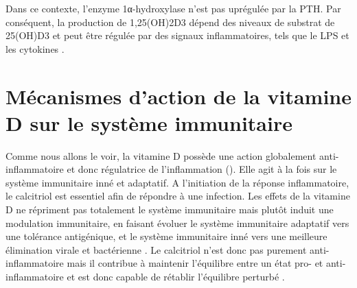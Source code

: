\documentclass[
  a4paper,
  DIV=11,
  numbers=noendperiod,
  listof=totoc]{scrreprt}
\begin{document}
Dans ce contexte, l'enzyme 1α-hydroxylase n'est pas uprégulée par la
\ac{PTH}. Par conséquent, la production de \ac{1,25(OH)2D3} dépend des
niveaux de substrat de \ac{25(OH)D3} et peut être régulée par des
signaux inflammatoires, tels que le \ac{LPS} et les cytokines
\autocite{Giannini.2022}.

\section{Mécanismes d'action de la vitamine D sur le système
immunitaire}\label{muxe9canismes-daction-de-la-vitamine-d-sur-le-systuxe8me-immunitaire}

Comme nous allons le voir, la vitamine D possède une action globalement
anti-inflammatoire et donc régulatrice de l'inflammation
(). Elle agit à la fois sur le système
immunitaire inné et adaptatif. A l'initiation de la réponse
inflammatoire, le calcitriol est essentiel afin de répondre à une
infection. Les effets de la vitamine D ne répriment pas totalement le
système immunitaire mais plutôt induit une modulation immunitaire, en
faisant évoluer le système immunitaire adaptatif vers une tolérance
antigénique, et le système immunitaire inné vers une meilleure
élimination virale et bactérienne \autocite{Martens.2020}. Le calcitriol
n'est donc pas purement anti-inflammatoire mais il contribue à maintenir
l'équilibre entre un état pro- et anti-inflammatoire et est donc capable
de rétablir l'équilibre perturbé \autocite{Dankers.2017}.
\end{document}
